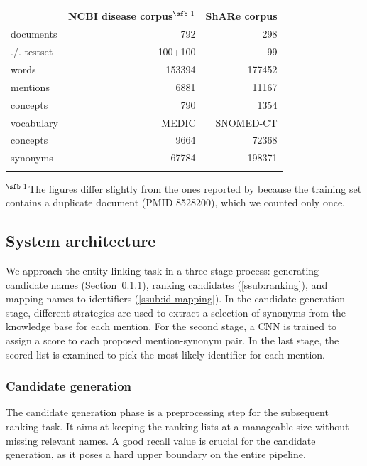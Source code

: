 \documentclass{bioinfo}
\begin{document}
\begin{table}[!t]
{\begin{tabular}{@{}lrr@{}}\toprule
              & NCBI disease corpus$^\text{\sfb 1}$ & ShARe corpus\\\midrule
  documents   & 792     & 298\\
  ./. testset & 100+100 & 99\\
  words       & 153394  & 177452\\
  mentions    & 6881    & 11167\\
  concepts    & 790     & 1354\\
  \midrule
  vocabulary  & MEDIC   & SNOMED-CT\\
  concepts    & 9664    & 72368\\
  synonyms    & 67784   & 198371\\
  \botrule
\end{tabular}}{$^\text{\sfb 1}$The figures differ slightly from the ones reported by \cite{islamaj-dogan-et-al:2014} because the training set contains a duplicate document (PMID 8528200), which we counted only once.}
\end{table}



\subsection{System architecture}

We approach the entity linking task in a three-stage process:
generating candidate names (Section~\ref{ssub:cand-gen}),
ranking candidates (\ref{ssub:ranking}), and
mapping names to identifiers (\ref{ssub:id-mapping}).
In the candidate-generation stage, different strategies are used to extract a selection of synonyms from the knowledge base for each mention.
For the second stage, a CNN is trained to assign a score to each proposed mention-synonym pair.
In the last stage, the scored list is examined to pick the most likely identifier for each mention.

\subsubsection{Candidate generation}
\label{ssub:cand-gen}

The candidate generation phase is a preprocessing step for the subsequent ranking task.
It aims at keeping the ranking lists at a manageable size without missing relevant names.
A good recall value is crucial for the candidate generation, as it poses a hard upper boundary on the entire pipeline.
\end{document}
